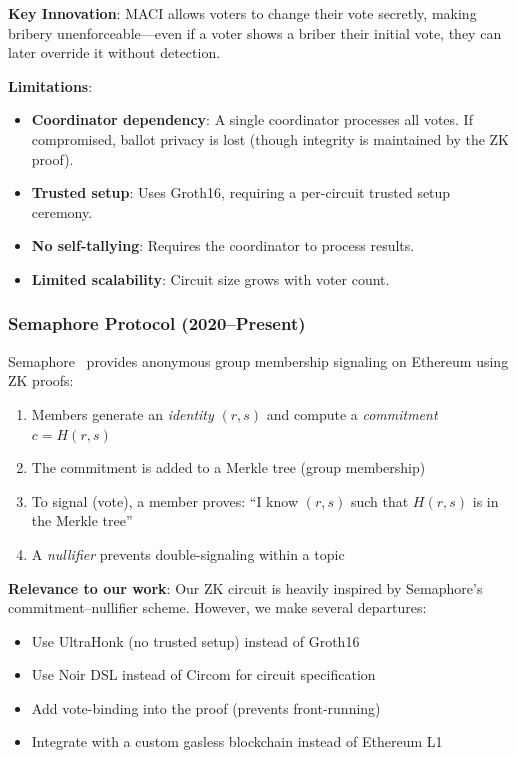 \textbf{Key Innovation}: MACI allows voters to change their vote secretly, making bribery unenforceable---even if a voter shows a briber their initial vote, they can later override it without detection.

\textbf{Limitations}:
\begin{itemize}
    \item \textbf{Coordinator dependency}: A single coordinator processes all votes. If compromised, ballot privacy is lost (though integrity is maintained by the ZK proof).
    \item \textbf{Trusted setup}: Uses Groth16, requiring a per-circuit trusted setup ceremony.
    \item \textbf{No self-tallying}: Requires the coordinator to process results.
    \item \textbf{Limited scalability}: Circuit size grows with voter count.
\end{itemize}

\subsubsection{Semaphore Protocol (2020--Present)}

Semaphore~\cite{semaphore2023} provides anonymous group membership signaling on Ethereum using ZK proofs:

\begin{enumerate}
    \item Members generate an \textit{identity} $(r, s)$ and compute a \textit{commitment} $c = H(r, s)$
    \item The commitment is added to a Merkle tree (group membership)
    \item To signal (vote), a member proves: ``I know $(r, s)$ such that $H(r, s)$ is in the Merkle tree''
    \item A \textit{nullifier} prevents double-signaling within a topic
\end{enumerate}

\textbf{Relevance to our work}: Our ZK circuit is heavily inspired by Semaphore's commitment--nullifier scheme. However, we make several departures:
\begin{itemize}
    \item Use UltraHonk (no trusted setup) instead of Groth16
    \item Use Noir DSL instead of Circom for circuit specification
    \item Add vote-binding into the proof (prevents front-running)
    \item Integrate with a custom gasless blockchain instead of Ethereum L1
\end{itemize}

